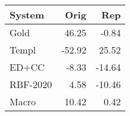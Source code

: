 \begin{tabular}{lrr}
\toprule
System & Orig & Rep \\
\midrule
Gold & 46.25 & -0.84 \\
Templ & -52.92 & 25.52 \\
ED+CC & -8.33 & -14.64 \\
RBF-2020 & 4.58 & -10.46 \\
Macro & 10.42 & 0.42 \\
\bottomrule
\end{tabular}
